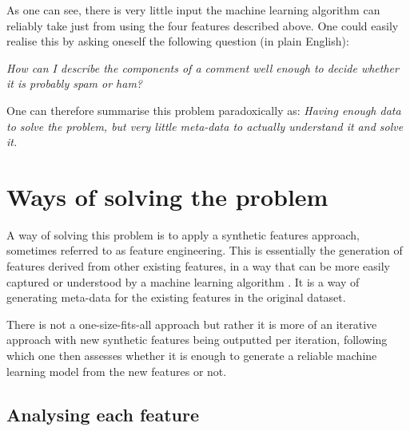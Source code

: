 As one can see, there is very little input the machine learning algorithm can reliably take just from using the four features described above. One could easily realise this by asking oneself the following question (in plain English):

\qquad \emph{How can I describe the components of a comment well enough to decide whether it is probably spam or ham?}

One can therefore summarise this problem paradoxically as: \emph{Having enough data to solve the problem, but very little meta-data to actually understand it and solve it.}

\section{Ways of solving the problem}
A way of solving this problem is to apply a synthetic features approach, sometimes referred to as feature engineering. This is essentially the generation of features derived from other existing features, in a way that can be more easily captured or understood by a machine learning algorithm \citep{LiFeatureEng}. It is a way of generating meta-data for the existing features in the original dataset.

There is not a one-size-fits-all approach but rather it is more of an iterative approach with new synthetic features being outputted per iteration, following which one then assesses whether it is enough to generate a reliable machine learning model from the new features or not.

\subsection{Analysing each feature} 

